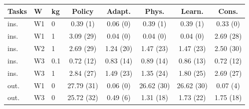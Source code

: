 \begin{tabular}{@{}lllccccc@{}}
\toprule
Tasks & W & kg & Policy & Adapt. & Phys. & Learn. & Cons.\\
\midrule
ins. & W1 & 0 & 0.39 (1) & 0.06 (0) & 0.39 (1) & 0.39 (1) & 0.33 (0)\\
ins. & W1 & 1 & 3.09 (29) & 0.04 (0) & 0.04 (0) & 0.04 (0) & 2.69 (28)\\
ins. & W2 & 1 & 2.69 (29) & 1.24 (20) & 1.47 (23) & 1.47 (23) & 2.50 (30)\\
ins. & W3 & 0.1 & 0.72 (12) & 0.83 (14) & 0.89 (14) & 0.86 (13) & 0.72 (12)\\
ins. & W3 & 1 & 2.84 (27) & 1.49 (23) & 1.35 (24) & 1.80 (25) & 2.69 (27)\\
out. & W1 & 0 & 27.79 (31) & 0.06 (0) & 26.62 (30) & 26.62 (30) & 0.07 (4)\\
out. & W3 & 0 & 25.72 (32) & 0.49 (6) & 1.31 (18) & 1.73 (22) & 1.75 (18)\\
\bottomrule
\end{tabular}
